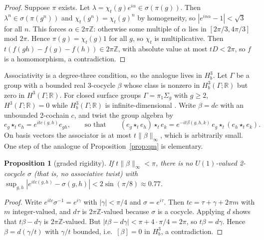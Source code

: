 \documentclass[11pt]{article}
\newtheorem{proposition}{Proposition}[section]
\theoremstyle{remark}
\begin{document}
\begin{proof}
Suppose $\pi$ exists. Let $\lambda=\chi_t(g)e^{i\alpha}\in\sigma(\pi(g))$. Then $\lambda^n\in\sigma(\pi(g^n))$ and $\chi_t(g^n)=\chi_t(g)^n$ by homogeneity, so $|e^{in\alpha}-1|<\sqrt3$ for all $n$. This forces $\alpha\in2\pi\mathbb{Z}$: otherwise some multiple of $\alpha$ lies in $[2\pi/3,4\pi/3]$ mod $2\pi$. Hence $\pi(g)=\chi_t(g)1$ for all $g$, so $\chi_t$ is multiplicative. Then $t(f(gh)-f(g)-f(h))\in2\pi\mathbb{Z}$, with absolute value at most $tD<2\pi$, so $f$ is a homomorphism, a contradiction.
\end{proof}

Associativity is a degree-three condition, so the analogue lives in $H^3_b$. Let $\Gamma$ be a group with a bounded real 3-cocycle $\beta$ whose class is nonzero in $H^3_b(\Gamma;\mathbb{R})$ but zero in $H^3(\Gamma;\mathbb{R})$. For closed surface groups $\Gamma=\pi_1\Sigma_g$ with $g\ge2$, $H^3(\Gamma;\mathbb{R})=0$ while $H^3_b(\Gamma;\mathbb{R})$ is infinite-dimensional \cite{Soma}. Write $\beta=dc$ with an unbounded 2-cochain $c$, and twist the group algebra by
\[
e_g\star_t e_h=e^{itc(g,h)}e_{gh},\qquad\text{so that}\qquad(e_g\star_te_h)\star_te_k=e^{-it\beta(g,h,k)}\,e_g\star_t(e_h\star_te_k).
\]
On basis vectors the associator is at most $t\|\beta\|_\infty$, which is arbitrarily small. One step of the analogue of Proposition~\ref{prop:qm} is elementary.

\begin{proposition}[graded rigidity]\label{prop:graded}
If $t\|\beta\|_\infty<\pi$, there is no $U(1)$-valued 2-cocycle $\sigma$ (that is, no associative twist) with $\sup_{g,h}|e^{itc(g,h)}-\sigma(g,h)|<2\sin(\pi/8)\approx0.77$.
\end{proposition}

\begin{proof}
Write $e^{itc}\sigma^{-1}=e^{i\gamma}$ with $|\gamma|<\pi/4$ and $\sigma=e^{i\tau}$. Then $tc=\tau+\gamma+2\pi m$ with $m$ integer-valued, and $d\tau$ is $2\pi\mathbb{Z}$-valued because $\sigma$ is a cocycle. Applying $d$ shows that $t\beta-d\gamma$ is $2\pi\mathbb{Z}$-valued. But $|t\beta-d\gamma|<\pi+4\cdot\pi/4=2\pi$, so $t\beta=d\gamma$. Hence $\beta=d(\gamma/t)$ with $\gamma/t$ bounded, i.e.\ $[\beta]=0$ in $H^3_b$, a contradiction.
\end{proof}
\end{document}
